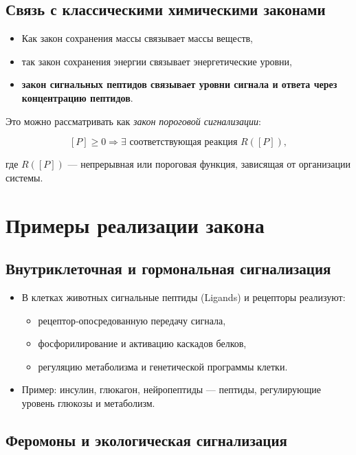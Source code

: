\documentclass[12pt]{article}
\begin{document}
\subsection{Связь с классическими химическими законами}

\begin{itemize}
  \item Как закон сохранения массы связывает массы веществ,
  \item так закон сохранения энергии связывает энергетические уровни,
  \item \textbf{закон сигнальных пептидов связывает уровни сигнала и ответа через концентрацию пептидов}.
\end{itemize}

Это можно рассматривать как \emph{закон пороговой сигнализации}:

\[
[P] \ge 0 \Rightarrow \exists \text{ соответствующая реакция } R([P]),
\]

где $R([P])$ — непрерывная или пороговая функция, зависящая от организации системы.

\section{Примеры реализации закона}

\subsection{Внутриклеточная и гормональная сигнализация}

\begin{itemize}
  \item В клетках животных сигнальные пептиды (Ligands) и рецепторы реализуют:
    \begin{itemize}
      \item рецептор‑опосредованную передачу сигнала,
      \item фосфорилирование и активацию каскадов белков,  
      \item регуляцию метаболизма и генетической программы клетки.
    \end{itemize}
  \item Пример: инсулин, глюкагон, нейропептиды — пептиды, регулирующие уровень глюкозы и метаболизм.
\end{itemize}

\subsection{Феромоны и экологическая сигнализация}
\end{document}
